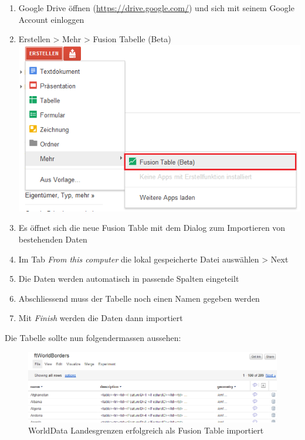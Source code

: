 \begin{enumerate}
\item Google Drive öffnen (\url{https://drive.google.com/}) und sich mit seinem Google Account einloggen
\item Erstellen > Mehr > Fusion Tabelle (Beta) \\ \includegraphics{images/usecase1-worlddata/documentation/worlddata-worldborders_import1.png}
\item Es öffnet sich die neue Fusion Table mit dem Dialog zum Importieren von bestehenden Daten
\item Im Tab \emph{From this computer} die lokal gespeicherte Datei auswählen > Next
\item Die Daten werden automatisch in passende Spalten eingeteilt
\item Abschliessend muss der Tabelle noch einen Namen gegeben werden
\item Mit \emph{Finish} werden die Daten dann importiert
\end{enumerate}

Die Tabelle sollte nun folgendermassen aussehen:

\begin{figure}[H]
	\centering
	\includegraphics[scale=0.65]{images/usecase1-worlddata/documentation/worlddata-worldborders_import_done.png}
	\caption{WorldData Landesgrenzen erfolgreich als Fusion Table importiert}
	\label{worlddata-worldborders_import_done}
\end{figure}

